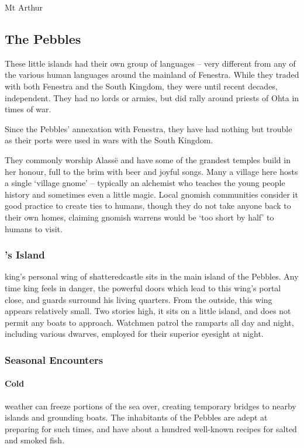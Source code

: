 \begin{multicols}{2}
\begin{encounters}{Mt Arthur}
\end{encounters}

\subsection{The Pebbles}


These little islands had their own group of languages -- very different from any of the various human languages around the mainland of Fenestra.  While they traded with both Fenestra and the South Kingdom, they were until recent decades, independent.  They had no lords or armies, but did rally around priests of Ohta in times of war.

Since the Pebbles' annexation with Fenestra, they have had nothing but trouble as their ports were used in wars with the South Kingdom.

They commonly worship Alass\"{e} and have some of the grandest temples build in her honour, full to the brim with beer and joyful songs.
Many a village here hosts a single `village gnome' -- typically an alchemist who teaches the young people history and sometimes even a little magic.
Local gnomish communities consider it good practice to create ties to humans, though they do not take anyone back to their own homes, claiming gnomish warrens would be `too short by half' to humans to visit.

\subsubsection{'s Island}

\Gls{king}'s personal wing of \gls{shatteredcastle} sits in the main island of the Pebbles.
Any time \gls{king} feels in danger, the powerful doors which lead to this wing's portal close, and guards surround his living quarters.
From the outside, this wing appears relatively small.
Two stories high, it sits on a little island, and does not permit any boats to approach.
Watchmen patrol the ramparts all day and night, including various dwarves, employed for their superior eyesight at night.

\subsubsection{Seasonal Encounters}

\paragraph{Cold} weather can freeze portions of the sea over, creating temporary bridges to nearby islands and grounding boats.
The inhabitants of the Pebbles are adept at preparing for such times, and have about a hundred well-known recipes for salted and smoked fish.

\end{multicols}

